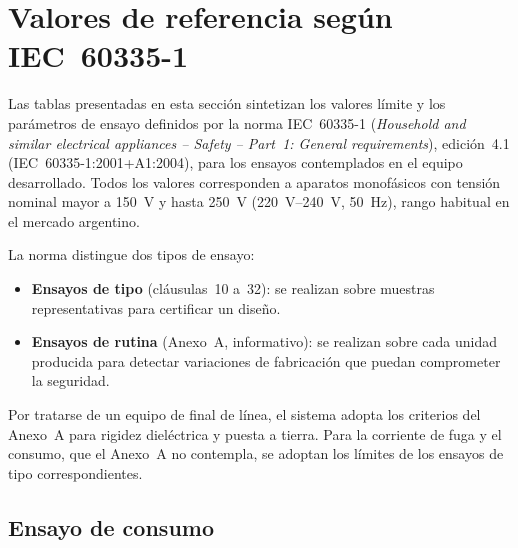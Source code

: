 %
%

\section{Valores de referencia según IEC~60335-1}
\label{sec:valores_referencia}

Las tablas presentadas en esta sección sintetizan los valores límite
y los parámetros de ensayo definidos por la norma IEC~60335-1
(\textit{Household and similar electrical appliances -- Safety --
Part~1: General requirements}), edición~4.1 (IEC~60335-1:2001+A1:2004),
para los ensayos contemplados en el equipo desarrollado.
Todos los valores corresponden a aparatos monofásicos con tensión nominal
mayor a \SI{150}{\volt} y hasta \SI{250}{\volt} (\SIrange{220}{240}{\volt},
\SI{50}{\hertz}), rango habitual en el mercado argentino.

La norma distingue dos tipos de ensayo:
\begin{itemize}
    \item \textbf{Ensayos de tipo} (cláusulas~10 a~32): se realizan sobre
          muestras representativas para certificar un diseño.
    \item \textbf{Ensayos de rutina} (Anexo~A, informativo): se realizan
          sobre cada unidad producida para detectar variaciones de
          fabricación que puedan comprometer la seguridad.
\end{itemize}
Por tratarse de un equipo de final de línea, el sistema adopta los
criterios del Anexo~A para rigidez dieléctrica y puesta a tierra.
Para la corriente de fuga y el consumo, que el Anexo~A no contempla,
se adoptan los límites de los ensayos de tipo correspondientes.

\subsection{Ensayo de consumo}
\label{subsec:tabla_potencia}

